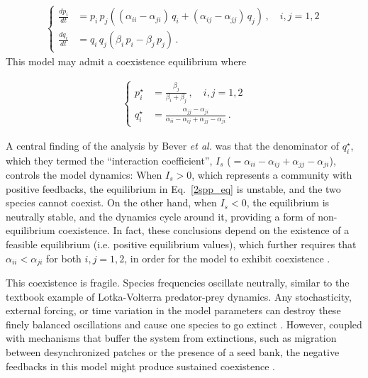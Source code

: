 \documentclass[11pt]{article}
\begin{document}
\begin{align} \label{2spp_relative}
\begin{cases}
\frac{dp_i}{dt} &= p_i \, p_j \left( (\alpha_{ii} - \alpha_{ji}) \, q_i + (\alpha_{ij} - \alpha_{jj}) \, q_j \right) \, , \quad  i, j = 1,2 \\
\frac{dq_i}{dt} &= q_i \, q_j (\beta_i \, p_i - \beta_j \, p_j) \, .
\end{cases}
\end{align}
This model may admit a coexistence equilibrium where

\begin{align} \label{2spp_eq}
\begin{cases}
p_i^\star &= \frac{\beta_j}{\beta_i + \beta_j} \, , \quad  i, j = 1,2 \\
q_i^\star &= \frac{\alpha_{jj} - \alpha_{ji}}{\alpha_{ii} - \alpha_{ij} + \alpha_{jj} - \alpha_{ji}} \, .
\end{cases}
\end{align}

A central finding of the analysis by Bever \textit{et al.} was that the denominator of $q_i^\star$, which they termed the ``interaction coefficient'', $I_s$ ($= \alpha_{ii} - \alpha_{ij} + \alpha_{jj} - \alpha_{ji}$), controls the model dynamics: When $I_s > 0$, which represents a community with positive feedbacks, the equilibrium in Eq.~\ref{2spp_eq} is unstable, and the two species cannot coexist. On the other hand, when $I_s < 0$, the equilibrium is neutrally stable, and the dynamics cycle around it, providing a form of non-equilibrium coexistence. In fact, these conclusions depend on the existence of a feasible equilibrium (i.e. positive equilibrium values), which further requires that $\alpha_{ii} < \alpha_{ji}$ for both $i, j = 1, 2$, in order for the model to exhibit coexistence \citep{bever1997incorporating,ke2015incorporating}. 

This coexistence is fragile. Species frequencies oscillate neutrally, similar to the textbook example of Lotka-Volterra predator-prey dynamics. Any stochasticity, external forcing, or time variation in the model parameters can destroy these finely balanced oscillations and cause one species to go extinct \citep{revilla2013plant}. However, coupled with mechanisms that buffer the system from extinctions, such as migration between desynchronized patches or the presence of a seed bank, the negative feedbacks in this model might produce sustained coexistence \citep{revilla2013plant, bever2003soil}. 
\end{document}

